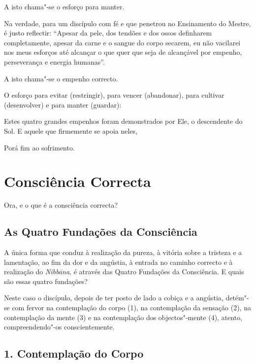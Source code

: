 A isto chama"-se o esforço para manter.


Na verdade, para um discípulo com fé e que penetrou no Ensinamento do Mestre, é
justo reflectir: “Apesar da pele, dos tendões e dos ossos definharem
completamente, apesar da carne e o sangue do corpo secarem, eu não vacilarei nos
meus esforços até alcançar o que quer que seja de alcançável por empenho,
perseverança e energia humanas”.

A isto chama"-se o empenho correcto.


O esforço para evitar (restringir), para vencer (abandonar), para cultivar (desenvolver) e para manter (guardar):

Estes quatro grandes empenhos foram demonstrados por Ele, o descendente do Sol.
E aquele que firmemente se apoia neles,

Porá fim ao sofrimento.


\section{Consciência Correcta}



Ora, e o que é a consciência correcta?

\subsection{As Quatro Fundações da Consciência}


A única forma que conduz à realização da pureza, à vitória sobre a tristeza e a
lamentação, ao fim da dor e da angústia, à entrada no caminho correcto e à
realização do \emph{Nibbāna}, é através das Quatro Fundações da Consciência. E
quais são essas quatro fundações?

Neste caso o discípulo, depois de ter posto de lado a cobiça e a angústia,
detém"-se com fervor na contemplação do corpo (1), na contemplação da sensação
(2), na contemplação da mente (3) e na contemplação dos objectos"-mente (4),
atento, compreendendo"-os conscientemente.

\subsection{1. Contemplação do Corpo}

